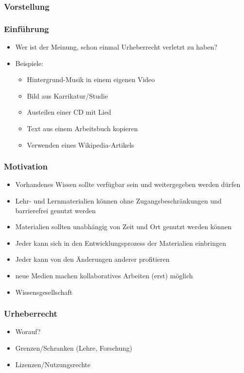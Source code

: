 \documentclass[14pt,handout]{beamer}
\begin{document}
\begin{frame}
    \frametitle{Vorstellung}
\end{frame}

\begin{frame}
    \frametitle{Einführung}
    \begin{itemize}
        \item<2-> Wer ist der Meinung, schon einmal Urheberrecht verletzt zu haben?
        \item<3-> Beispiele:
        \begin{itemize}
          \item<2-> Hintergrund-Musik in einem eigenen Video
          \item<2-> Bild aus Karrikatur/Studie
          \item<2-> Austeilen einer CD mit Lied
          \item<2-> Text aus einem Arbeitsbuch kopieren
          \item<2-> Verwenden eines Wikipedia-Artikels
        \end{itemize}
    \end{itemize}
\end{frame}

\begin{frame}
    \frametitle{Motivation}
    \begin{itemize}
        \item<2-> Vorhandenes Wissen sollte verfügbar sein und weitergegeben werden dürfen
        \item<3-> Lehr- und Lernmaterialien können ohne Zugangsbeschränkungen und barrierefrei genutzt werden
        \item<4-> Materialien sollten unabhängig von Zeit und Ort genutzt werden können
        \item<5-> Jeder kann sich in den Entwicklungsprozess der Materialien einbringen
        \item<6-> Jeder kann von den Änderungen anderer profitieren
        \item<7-> neue Medien machen kollaboratives Arbeiten (erst) möglich
        \item<8-> Wissensgesellschaft
    \end{itemize}
\end{frame}

\begin{frame}
    \frametitle{Urheberrecht}
    \begin{itemize}
        \item<2-> Worauf?
        \item<3-> Grenzen/Schranken (Lehre, Forschung)
        \item<4-> Lizenzen/Nutzungsrechte
    \end{itemize}
\end{frame}
\end{document}
